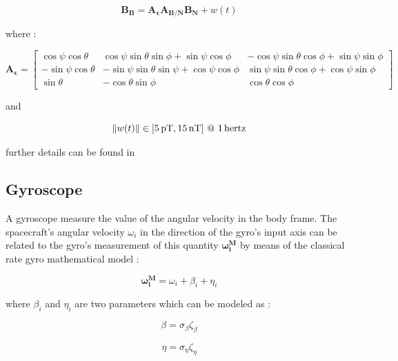 \documentclass[11pt,a4paper]{report}
\begin{document}
\begin{equation}
 \mathbf{B_{B}} = \mathbf{A_{\epsilon}} \mathbf{A_{B/N}} \mathbf{B_{N}} + w(t)
\end{equation}

where : 

\begin{equation*}
 \mathbf{A_{\epsilon}} =
                                \begin{bmatrix}
                                    \cos\psi\cos\theta & \cos\psi\sin\theta\sin\phi + \sin\psi\cos\phi & -\cos\psi\sin\theta\cos\phi + \sin\psi\sin\phi \\
                                    -\sin\psi\cos\theta & -\sin\psi\sin\theta\sin\psi + \cos\psi\cos\phi & \sin\psi\sin\theta\cos\phi + \cos\psi\sin\phi \\
                                    \sin\theta & -\cos\theta\sin\phi & \cos\theta\cos\phi
                                \end{bmatrix}
\end{equation*}
 
and 

\begin{equation*}
 \norm{w(t)} \in [\SI{5}{\pico\tesla},\SI{15}{\nano\tesla}] \ @ \ \SI{1}{hertz}
\end{equation*}

further details can be found in \cite{notes:bigss}

\subsection{Gyroscope}
A gyroscope measure the value of the angular velocity in the body frame.
The spacecraft's angular velocity $\omega_{i}$ in the direction of the gyro's input axis can be related to the gyro's measurement of this quantity $\mathbf{\omega_{i}^{M}}$ by means of the classical rate gyro mathematical model : 

\begin{equation}
 \mathbf{\omega_{i}^{M}} = \omega_{i} + \beta_{i} + \eta_{i}
\end{equation}

where  $\beta_{i}$ and $\eta_{i}$ are two parameters which can be modeled as :

\begin{equation*}
 \beta = \sigma_{\beta} \zeta_{\beta}
\end{equation*}

\begin{equation*}
 \eta = \sigma_{\eta} \zeta_{\eta}
\end{equation*}
\end{document}

